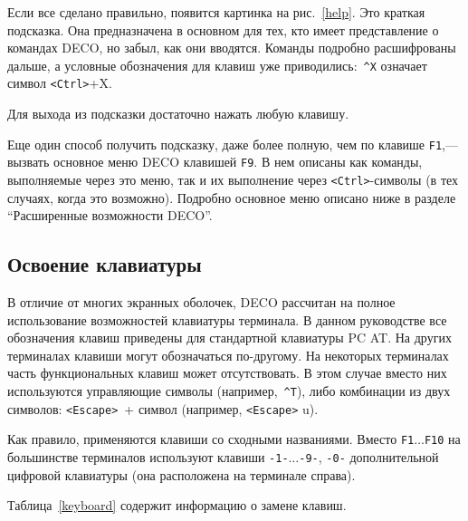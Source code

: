 
Если все сделано правильно, появится картинка на рис.~\ref{help}.
Это краткая подсказка. Она предназначена в
основном для тех, кто имеет представление
о командах DECO, но забыл, как они вводятся.
Команды подробно расшифрованы дальше,
а условные обозначения для клавиш уже приводились:~{\tt \^{}X}
означает символ {\tt <Ctrl>}+X.

Для выхода из подсказки достаточно нажать любую клавишу.

Еще один способ получить подсказку, даже более полную, чем по
клавише {\tt F1},--- вызвать основное меню DECO клавишей {\tt F9}. В нем
описаны как команды, выполняемые через это меню, так и их
выполнение через {\tt <Ctrl>}-символы (в тех случаях, когда
это возможно). Подробно основное меню описано ниже в разделе
``Расширенные возможности DECO''.

\subsection{Освоение клавиатуры}

В отличие от многих экранных оболочек, DECO рассчитан на
полное использование возможностей клавиатуры терминала.
В данном руководстве все обозначения клавиш приведены
для стандартной клавиатуры PC AT.
На других терминалах клавиши могут обозначаться по-другому.
На некоторых терминалах часть функциональных клавиш
может отсутствовать. В этом случае вместо них используются
управляющие символы (например,~{\tt \^{}T}), либо комбинации из двух
символов: {\tt <Escape>}~+ символ (например, {\tt <Escape>} u).

Как правило, применяются клавиши со сходными названиями.
Вместо {\tt F1}$\ldots${\tt F10} на большинстве терминалов используют
клавиши {\tt -1-}$\ldots${\tt -9-}, {\tt -0-} дополнительной цифровой клавиатуры
(она расположена на терминале справа).

Таблица~\ref{keyboard} содержит информацию о замене клавиш.


